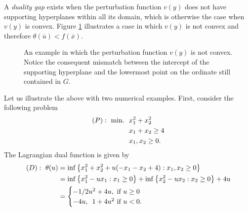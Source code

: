A \emph{duality gap} exists when the perturbation function $v(y)$ does not have supporting hyperplanes within all its domain, which is otherwise the case when $v(y)$ is convex. Figure \ref{fig:nonconvex_G} illustrates a case in which $v(y)$ is not convex and therefore $\theta(\overline{u}) < f(\overline{x})$.

\begin{figure}[h]
			 \label{fig:nonconvex_G}
			\caption{An example in which the perturbation function $v(y)$ is not convex. Notice the consequent mismatch between the intercept of the supporting hyperplane and the lowermost point on the ordinate still contained in $G$.} \label{fig:nonconvex_G}
	\end{figure}


Let us illustrate the above with two numerical examples. First, consider the following problem
%
\begin{align*}
	(P):~ \mathop{\text{min.~}} \ & x_1^2 + x_2^2 \\
	& x_1 + x_2 \geq 4 \\
	& x_1, x_2 \geq 0.
\end{align*}
%
The Lagrangian dual function is given by 
%
\begin{align*} 
	(D):~\theta(u) & = \inf \left\{ x_1^2 + x_2^2 + u(-x_1 -x_2 + 4) : x_1, x_2 \geq 0 \right \} \\
	& = \inf \left\{ x_1^2 - ux_1 : x_1 \geq 0 \right \} + \inf \left\{ x_2^2 - ux_2 : x_2 \geq 0 \right \} + 4u \\
	& = \begin{cases}
	     -1/2u^2 + 4u, \text{ if } u \geq 0 \\
	     -4u, ~\, 1 + 4u^2 \text{ if } u < 0. 
	 \end{cases}
\end{align*}

